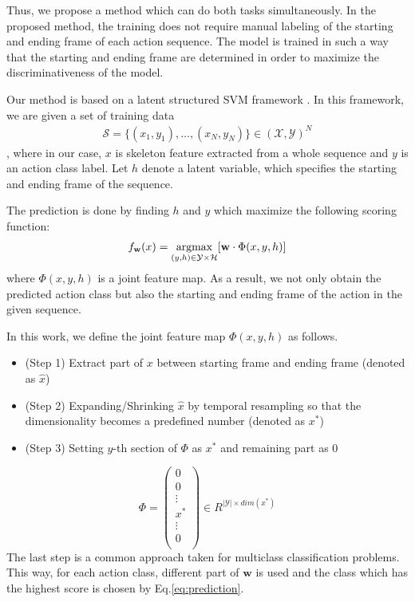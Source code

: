 \documentclass[10pt,twocolumn,letterpaper]{article}
\newcommand{\argmax}{\operatornamewithlimits{argmax}}
\begin{document}
Thus, we propose a method which can do both tasks simultaneously. In the proposed method, the training does not require manual labeling of the starting and ending frame of each action sequence. The model is trained in such a way that the starting and ending frame are determined in order to maximize the discriminativeness of the model. 

Our method is based on a latent structured SVM framework \cite{LatentSVM}. In this framework, we are given a set of training data
\begin{align*}
\mathcal{S}=\{(x_1,y_1),\dots,(x_N,y_N)\} \in (\mathcal{X},\mathcal{Y})^N
\end{align*},
where in our case, $x$ is skeleton feature extracted from a whole sequence and $y$ is an action class label.
Let $h$ denote a latent variable, which specifies the starting and ending frame of the sequence.

The prediction is done by finding $h$ and $y$ which maximize the following scoring function:
\begin{align}\label{eq:prediction}
f_{\mathbf{w}}(x) = \argmax_{(y,h) \in \mathcal{Y} \times \mathcal{H}} [ \mathbf{w} \cdot \Phi(x,y,h)]
\end{align}
where $\Phi(x,y,h)$ is a joint feature map. As a result, we not only obtain the predicted action class but also the starting and ending frame of the action in the given sequence.

In this work, we define the joint feature map $\Phi(x,y,h)$ as follows.
\begin{itemize}

  \item (Step 1) Extract part of $x$ between starting frame and ending frame (denoted as $\hat{x}$) 
  \item (Step 2) Expanding/Shrinking $\hat{x}$ by temporal resampling so that the dimensionality becomes a predefined number (denoted as $x^{*}$)
    \item  (Step 3) Setting $y$-th section of $\Phi$ as $x^{*}$ and remaining part as 0
\end{itemize}
\begin{equation}\label{M}
\Phi =
\begin{pmatrix}
  0  \\
  0  \\
  \vdots \\
  x^* \\
  \vdots \\
    0   \\
\end{pmatrix}
\in R^{ |\mathcal{Y}| \times dim(x^*)}
\end{equation}
The last step is a common approach taken for multiclass classification problems. This way, for each action class, different part of $\mathbf{w}$ is used and the class which has the highest score is chosen by Eq.\ref{eq:prediction}.
\end{document}
